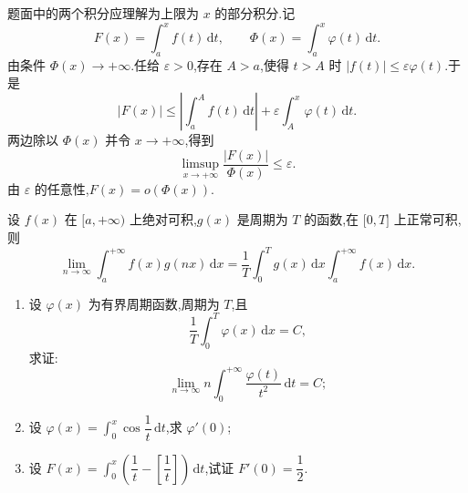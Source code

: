 \begin{solution}
  题面中的两个积分应理解为上限为 $x$ 的部分积分.记
  \[
    F(x)=\int_a^xf(t)\,\mathrm{d}t,
    \qquad
    \Phi(x)=\int_a^x\varphi(t)\,\mathrm{d}t.
  \]
  由条件 $\Phi(x)\to+\infty$.任给 $\varepsilon>0$,存在 $A>a$,使得
  $t>A$ 时 $|f(t)|\leq\varepsilon\varphi(t)$.于是
  \[
    |F(x)|\leq\left|\int_a^Af(t)\,\mathrm{d}t\right|
    +\varepsilon\int_A^x\varphi(t)\,\mathrm{d}t.
  \]
  两边除以 $\Phi(x)$ 并令 $x\to+\infty$,得到
  \[
    \displaystyle\limsup\limits_{x\to+\infty}\dfrac{|F(x)|}{\Phi(x)}\leq\varepsilon.
  \]
  由 $\varepsilon$ 的任意性,$F(x)=o(\Phi(x))$.
\end{solution}

\begin{proposition}
  设 $f(x)$ 在 $\lbrack a,+\infty)$ 上绝对可积,$g(x)$ 是周期为 $T$ 的函数,在 $\lbrack 0,T\rbrack$ 上正常可积,则
  \[
    \displaystyle\lim\limits_{n\to\infty}\int_a^{+\infty}f(x)g(nx)\,\mathrm{d}x
    =\dfrac{1}{T}\int_0^Tg(x)\,\mathrm{d}x\int_a^{+\infty}f(x)\,\mathrm{d}x.
  \]
\end{proposition}

\begin{example}
  \begin{enumerate}
    \item 设 $\varphi(x)$ 为有界周期函数,周期为 $T$,且
          \[
            \dfrac{1}{T}\int_0^T\varphi(x)\,\mathrm{d}x=C,
          \]
          求证:
          \[
            \displaystyle\lim\limits_{n\to\infty}n\int_0^{+\infty}\dfrac{\varphi(t)}{t^2}\,\mathrm{d}t=C;
          \]
    \item 设 $\displaystyle\varphi(x)=\int_0^x\cos\dfrac{1}{t}\,\mathrm{d}t$,求 $\varphi'(0)$;
    \item 设 $\displaystyle F(x)=\int_0^x\left(\dfrac{1}{t}-\left[\dfrac{1}{t}\right]\right)\,\mathrm{d}t$,试证 $F'(0)=\dfrac{1}{2}$.
  \end{enumerate}
\end{example}
\exampleblank

